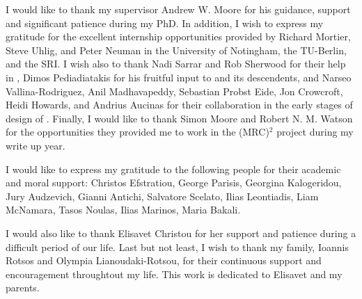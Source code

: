 

\begin{acknowledgements}      %


I would like to thank my supervisor Andrew W. Moore for his guidance, support
and significant patience during my PhD. In addition, I wish to express my
gratitude for the excellent internship opportunities provided by Richard
Mortier, Steve Uhlig, and Peter Neuman in the University of Notingham, the
TU-Berlin, and the SRI\@. I wish also to thank Nadi Sarrar and Rob Sherwood for
their help in \oflops, Dimos Pediadiatakis for his fruitful input to \sdnsim
and its descendents, and Narseo Vallina-Rodriguez, Anil Madhavapeddy, Sebastian
Probst Eide, Jon Crowcroft, Heidi Howards, and Andrius Aucinas for their collaboration
in the early stages of design of \signpost. Finally, I would like to thank Simon
Moore and Robert N. M. Watson for the opportunities they provided me to work in
the (MRC)$^2$ project during my write up year.

I would like to express my gratitude to the following people for their academic
and moral support: Christos Efstratiou, George Parisis, Georgina Kalogeridou,
Jury Audzevich, Gianni Antichi, Salvatore Scelato, Ilias Leontiadis, Liam
McNamara, Tasos Noulas, Ilias Marinos, Maria Bakali.

I would also like to thank Elisavet Christou for her support and patience
during a difficult period of our life. Last but not least, I wish to thank my
family, Ioannis Rotsos and Olympia Lianoudaki-Rotsou, for their continuous
support and encouragement throughtout my life. This work is dedicated to
Elisavet and my parents. 

\end{acknowledgements}


